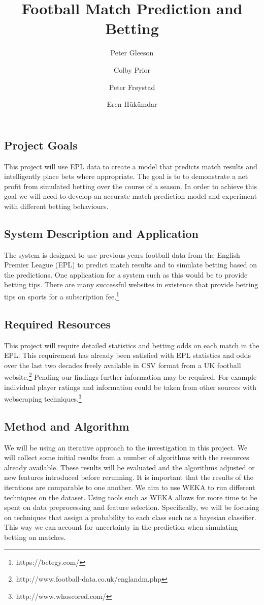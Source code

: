 \documentclass[10pt,twocolumn]{article}
\title{Football Match Prediction and Betting}
\author{Peter Gleeson \and Colby Prior \and Peter Frøystad \and Eren Hükümdar}
\begin{document}
  \maketitle

\subsection{Project Goals}
This project will use EPL data to create a model that predicts match results and intelligently place bets where appropriate. The goal is to to demonstrate a net profit from simulated betting over the course of a season. In order to achieve this goal we will need to develop an accurate match prediction model and experiment with different betting behaviours. 
\subsection{System Description and Application}
The system is designed to use previous years football data from the English Premier League (EPL) to predict match results and to simulate betting based on the predictions. One application for a system such as this would be to provide betting tips. There are many successful websites in existence that provide betting tips on sports for a subscription fee.\footnote{https://betegy.com/}
\subsection{Required Resources}
This project will require detailed statistics and betting odds on each match in the EPL. This requirement has already been satisfied with EPL statistics and odds over the last two decades freely available in CSV format from a UK football website.\footnote{http://www.football-data.co.uk/englandm.php} Pending our findings further information may be required. For example individual player ratings and information could be taken from other sources with webscraping techniques.\footnote{http://www.whoscored.com/}
\subsection{Method and Algorithm}
We will be using an iterative approach to the investigation in this project. We will collect some initial results from a number of algorithms with the resources already available. These results will be evaluated and the algorithms adjusted or new features introduced before rerunning. It is important that the results of the iterations are comparable to one another. We aim to use WEKA to run different techniques on the dataset. Using tools such as WEKA allows for more time to be spent on data preprocessing and feature selection. Specifically, we will be focusing on techniques that assign a probability to each class such as a bayesian classifier. This way we can account for uncertainty in the prediction when simulating betting on matches.
\end{document}
